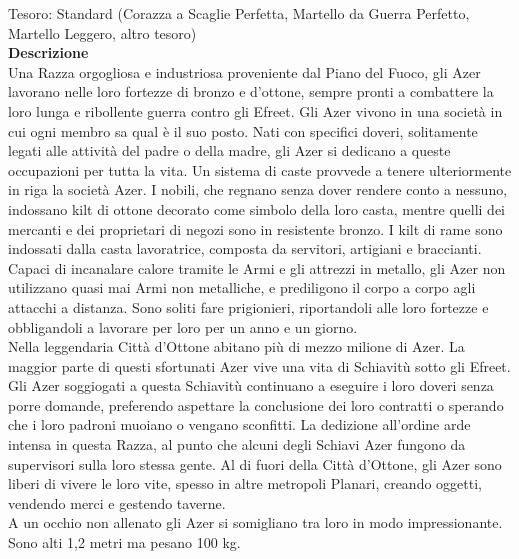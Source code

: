 \begin{multicols}{2}
Tesoro: Standard (Corazza a Scaglie Perfetta, Martello da Guerra Perfetto, Martello Leggero, altro tesoro)\\
\textbf{Descrizione}\\
Una Razza orgogliosa e industriosa proveniente dal Piano del Fuoco, gli Azer lavorano nelle loro fortezze di bronzo e d’ottone, sempre pronti a combattere la loro lunga e ribollente guerra contro gli Efreet. Gli Azer vivono in una società in cui ogni membro sa qual è il suo posto. Nati con specifici doveri, solitamente legati alle attività del padre o della madre, gli Azer si dedicano a queste occupazioni per tutta la vita. Un sistema di caste provvede a tenere ulteriormente in riga la società Azer. I nobili, che regnano senza dover rendere conto a nessuno, indossano kilt di ottone decorato come simbolo della loro casta, mentre quelli dei mercanti e dei proprietari di negozi sono in resistente bronzo. I kilt di rame sono indossati dalla casta lavoratrice, composta da servitori, artigiani e braccianti.\\
Capaci di incanalare calore tramite le Armi e gli attrezzi in metallo, gli Azer non utilizzano quasi mai Armi non metalliche, e prediligono il corpo a corpo agli attacchi a distanza. Sono soliti fare prigionieri, riportandoli alle loro fortezze e obbligandoli a lavorare per loro per un anno e un giorno.\\
Nella leggendaria Città d'Ottone abitano più di mezzo milione di Azer. La maggior parte di questi sfortunati Azer vive una vita di Schiavitù sotto gli Efreet. Gli Azer soggiogati a questa Schiavitù continuano a eseguire i loro doveri senza porre domande, preferendo aspettare la conclusione dei loro contratti o sperando che i loro padroni muoiano o vengano sconfitti. La dedizione all'ordine arde intensa in questa Razza, al punto che alcuni degli Schiavi Azer fungono da supervisori sulla loro stessa gente. Al di fuori della Città d'Ottone, gli Azer sono liberi di vivere le loro vite, spesso in altre metropoli Planari, creando oggetti, vendendo merci e gestendo taverne.\\
A un occhio non allenato gli Azer si somigliano tra loro in modo impressionante. Sono alti 1,2 metri ma pesano 100 kg.\\


\end{multicols}
